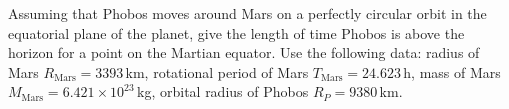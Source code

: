 Assuming that Phobos moves around Mars on a perfectly circular orbit in the
equatorial plane of the planet, give the length of time Phobos is above the
horizon for a point on the Martian equator. Use the following data: radius of
Mars $R_{\mathrm{Mars}} = 3393$\,km, rotational period of Mars
$T_{\mathrm{Mars}} = 24.623$\,h, mass of Mars
$M_{\mathrm{Mars}} = 6.421 \times 10^{23}$\,kg, orbital radius of Phobos
$R_P = 9380$\,km.
